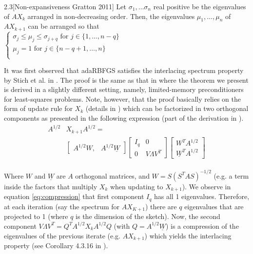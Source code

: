 \documentclass[12pt,conference,compsocconf]{IEEEtran}
\begin{document}
\begin{customthm}{2.3}[Non-expansiveness Gratton 2011]\label{thm:interlacing}
Let $\sigma_1,\ldots\sigma_n$ real positive be the eigenvalues of $AX_{k}$ arranged in non-decreasing order. Then, the eigenvalues $\mu_1,\ldots,\mu_n$ of $AX_{k+1}$ can be arranged so that\\
\vspace{6mm}
$\left\{
    	\begin{array}{ll}
        	\sigma_j\leq\mu_j\leq\sigma_{j+q}\text{  for } j \in \{1,\ldots,n-q\}\\ 
            \mu_j=1 \text{                           for } j \in\{n-q+1,\ldots,n\}\\
        \end{array}                 
    \right.$
\end{customthm}
\vspace{-5mm}
It was first observed that adaRBFGS satisfies the interlacing spectrum property by Stich et al. in \cite{Stich1}. The proof is the same as that in \cite{Gratton} where the theorem we present is derived in a slightly different setting, namely, limited-memory preconditioners for least-squares problems. Note, however, that the proof basically relies on the form of update rule for $X_k$ (details in \cite{Gratton}) which can be factorized in two orthogonal components as presented in the following expression (part of the derivation in \cite{Gratton}).
\vspace{-7mm}
\begin{align}\label{eq:compression}
		A^{1/2}&X_{k+1}A^{1/2}
    	=\\ \nonumber
    	&\begin{bmatrix}
    		A^{1/2}W, & A^{1/2}\underline{W}
    	\end{bmatrix}
        \begin{bmatrix}
			I_q & 0\\
    		0 & V\Lambda V^T
		\end{bmatrix}
    	\begin{bmatrix}
    		W^TA^{1/2}\\
        	\underline{W}^TA^{1/2}
    	  \end{bmatrix} \nonumber
\end{align}
\vspace{-5mm}
\\
Where $W$ and $\underline{W}$ are $A$ orthogonal matrices, and $W=S(S^TAS)^{-1/2}$ (e.g. a term inside the factors that multiply $X_k$ when updating to $X_{k+1}$).
We observe in equation \ref{eq:compression} that first component $I_q$ has all 1 eigenvalues. Therefore, at each iteration (say the spectrum for $AX_{K+1}$) there are $q$ eigenvalues that are projected to 1 (where $q$ is the dimension of the sketch). Now, the second component $V\Lambda V^T=Q^TA^{1/2}X_kA^{1/2}Q$ (with $Q=A^{1/2}\underline{W}$) is a compression of the eigenvalues of the previous iterate (e.g. $AX_{k+1}$) which yields the interlacing property (see Corollary 4.3.16 in \cite{Horn}).\\
\end{document}
